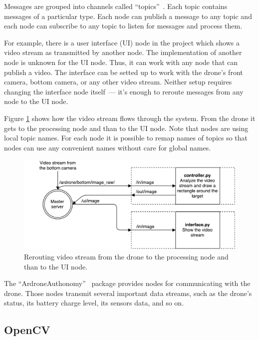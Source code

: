 \documentclass[12pt]{article}
\begin{document}
    Messages are grouped into
    channels called ``topics''~\cite{rostopic}.
    Each topic contains messages of a particular type.
    Each node can publish a message to any topic and each node can subscribe
    to any topic to listen for messages and process them.

    For example, there is a user interface (UI) node in the project which shows a video
    stream as transmitted by another node. The implementation of another node
    is unknown for the UI node. Thus, it can work with any node that can publish
    a video. The interface can be setted up to work with the drone's front camera,
    bottom camera, or any other video stream. Neither setup requires changing
    the interface node itself~--- it's enough to reroute messages from any
    node to the UI node.

    Figure \ref{fig:reroute} shows how the video stream
    flows through the system. From the drone it gets to the processing node
    and than to the UI node.
    Note that nodes are using local topic names. For each node it is possible
    to remap names of topics so that nodes can use any convenient names
    without care for global names.

    \begin{figure}[htbp]
        \noindent\centering
            \includegraphics[width=\textwidth]{reroute.pdf}
        \caption{Rerouting video stream from the drone to the processing node
        and than to the UI node.}
        \label{fig:reroute}
    \end{figure}

    The ``ArdroneAuthonomy''~\cite{ArdroneAuthonomy}
    package provides nodes for communicating
    with the drone. Those nodes transmit several important data streams,
    such as the drone's status, its battery charge level, its sensors data,
    and so on.

    \subsection{OpenCV}
    
\end{document}
